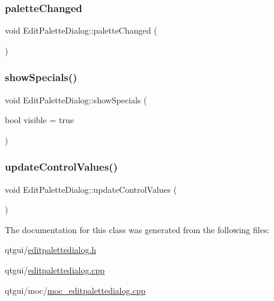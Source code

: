 \mbox{\label{class_edit_palette_dialog_abbbe561bee6cdc5466a18feee86b3400}} 
\subsubsection{\texorpdfstring{paletteChanged}{paletteChanged}}
{\footnotesize\ttfamily void Edit\+Palette\+Dialog\+::palette\+Changed (\begin{DoxyParamCaption}{ }\end{DoxyParamCaption})\hspace{0.3cm}{\ttfamily [signal]}}

\mbox{\label{class_edit_palette_dialog_a4796d65ae16b08590f2503f3616aa97a}} 
\subsubsection{\texorpdfstring{showSpecials()}{showSpecials()}}
{\footnotesize\ttfamily void Edit\+Palette\+Dialog\+::show\+Specials (\begin{DoxyParamCaption}\item[{bool}]{visible = {\ttfamily true} }\end{DoxyParamCaption})}

\mbox{\label{class_edit_palette_dialog_adac29663b7210f76ab09ed48c2943a2b}} 
\subsubsection{\texorpdfstring{updateControlValues()}{updateControlValues()}}
{\footnotesize\ttfamily void Edit\+Palette\+Dialog\+::update\+Control\+Values (\begin{DoxyParamCaption}{ }\end{DoxyParamCaption})\hspace{0.3cm}{\ttfamily [protected]}}



The documentation for this class was generated from the following files\+:\begin{DoxyCompactItemize}
\item 
qtgui/\mbox{\hyperlink{editpalettedialog_8h}{editpalettedialog.\+h}}\item 
qtgui/\mbox{\hyperlink{editpalettedialog_8cpp}{editpalettedialog.\+cpp}}\item 
qtgui/moc/\mbox{\hyperlink{moc__editpalettedialog_8cpp}{moc\+\_\+editpalettedialog.\+cpp}}\end{DoxyCompactItemize}
